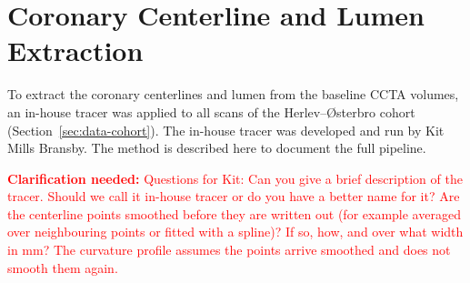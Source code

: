 \providecommand{\clarify}[1]{\textcolor{red}{\textbf{Clarification needed:} #1}}
\providecommand{\ask}[1]{\textcolor{red}{[#1]}}
\section{Coronary Centerline and Lumen Extraction}
\label{sec:method-tracer}

To extract the coronary centerlines and lumen from the baseline CCTA volumes, an in-house tracer was applied to all scans of the Herlev--{\O}sterbro cohort (Section~\ref{sec:data-cohort}). The in-house tracer was developed and run by Kit Mills Bransby. The method is described here to document the full pipeline. 


\clarify{Questions for Kit: Can you give a brief description of the tracer. Should we call it in-house tracer or do you have a better name for it? Are the centerline points smoothed before they are written out (for example averaged over neighbouring points or fitted with a spline)? If so, how, and over what width in mm? The curvature profile assumes the points arrive smoothed and does not smooth them again.}
